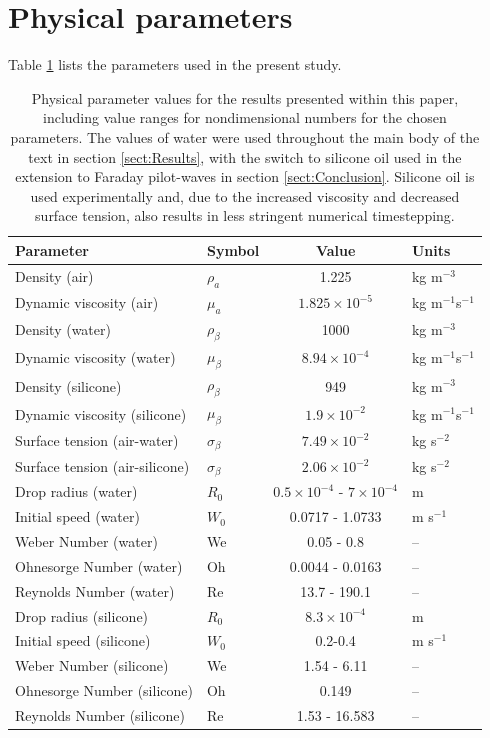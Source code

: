 \appendix
\section{Physical parameters}\label{app: Table}
Table \ref{tab: Appendix} lists the parameters used in the present study.
\begin{table}
\begin{center}
\begin{tabular}{l l c l}
\hline
Parameter  & Symbol &  Value & Units  \\
\hline
\hline
Density (air) &  $\rho_a $  & 1.225 & kg m$^{-3}$\\
Dynamic viscosity (air) & $\mu_a $  & $1.825\times 10^{-5}$ & kg m$^{-1}$s$^{-1}$\\

Density (water) &   $\rho_\beta $  &1000 &kg m$^{-3}$\\
Dynamic viscosity (water)  &   $\mu_\beta $  & $8.94\times 10^{-4}$& kg m$^{-1}$s$^{-1}$\\
Density (silicone) &   $\rho_\beta $  &949 &kg m$^{-3}$\\
Dynamic viscosity (silicone) &  $\mu_\beta $  & $1.9\times10^{-2}$ &kg m$^{-1}$s$^{-1}$\\ 

Surface tension (air-water)  &  $\sigma_\beta $  & $7.49\times10^{-2}$ &kg s$^{-2}$\\
Surface tension (air-silicone) &  $\sigma_\beta $  & $2.06\times10^{-2}$ &kg s$^{-2}$ \\
\hline
Drop radius (water) &  $R_0 $  & $0.5\times 10^{-4}$ - $7\times 10^{-4}$ &m\\
Initial speed (water) &   $W_0 $  & 0.0717 - 1.0733 &m s$^{-1}$\\
Weber Number (water) &  We  & 0.05 - 0.8 & --\\
Ohnesorge Number (water) &  Oh  & 0.0044 - 0.0163 &--\\
Reynolds Number (water) & Re & 13.7 - 190.1 &--\\
 \hline
 Drop radius (silicone) &  $R_0 $  & $8.3\times 10^{-4}$ &m\\
Initial speed (silicone) &   $W_0 $  & 0.2-0.4 &m s$^{-1}$\\
Weber Number (silicone) &  We  &  1.54 - 6.11 & -- \\
Ohnesorge Number (silicone) &  Oh  & 0.149 & --\\
Reynolds Number (silicone) & Re & 1.53 - 16.583 & --\\
\hline
\end{tabular}
\caption{Physical parameter values for the results presented within this paper, including value ranges for nondimensional numbers for the chosen parameters. The values of water were used throughout the main body of the text in section \ref{sect:Results}, with the switch to silicone oil used in the extension to Faraday pilot-waves in section \ref{sect:Conclusion}. Silicone oil is used experimentally and, due to the increased viscosity and decreased surface tension, also results in less stringent numerical timestepping. }\label{tab: Appendix}
\end{center}
\end{table}

